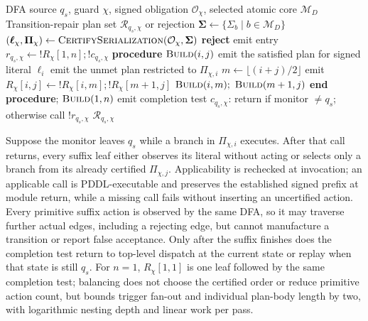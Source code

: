 \begin{algorithm}[htbp]
\caption{Compile a Certified DFA Progress Controller}
\label{alg:temporal}
\begin{algorithmic}[1]
\REQUIRE DFA source $q_s$, guard $\chi$, signed obligation $\mathcal O_\chi$,
selected atomic core $\mathcal M_D$
\ENSURE Transition-repair plan set $\mathcal R_{q_s,\chi}$ or rejection
\STATE $\boldsymbol\Sigma\leftarrow
\{\Sigma_b\mid b\in\mathcal M_D\}$
\STATE $(\boldsymbol\ell_\chi,\boldsymbol\Pi_\chi)\leftarrow
\textsc{CertifySerialization}(\mathcal O_\chi,\boldsymbol\Sigma)$
\IF{$(\boldsymbol\ell_\chi,\boldsymbol\Pi_\chi)=\bot$}
  \STATE \textbf{reject}
\ENDIF
\STATE emit entry $r_{q_s,\chi}\leftarrow !R_\chi[1,n];!c_{q_s,\chi}$
\STATE \textbf{procedure} $\textsc{Build}(i,j)$
  \STATE emit the satisfied plan for signed literal $\ell_i$
    \STATE emit the unmet plan restricted to $\Pi_{\chi,i}$
  \ENDIF
\ELSE
  \STATE $m\leftarrow\lfloor(i+j)/2\rfloor$
  \STATE emit $R_\chi[i,j]\leftarrow !R_\chi[i,m];!R_\chi[m+1,j]$
  \STATE $\textsc{Build}(i,m);\ \textsc{Build}(m+1,j)$
\ENDIF
\STATE \textbf{end procedure}; $\textsc{Build}(1,n)$
\STATE emit completion test $c_{q_s,\chi}$: return if monitor $\ne q_s$;
otherwise call $!r_{q_s,\chi}$
\RETURN $\mathcal R_{q_s,\chi}$
\end{algorithmic}
\end{algorithm}

Suppose the monitor leaves $q_s$ while a branch in $\Pi_{\chi,i}$ executes. After
that call returns, every suffix leaf either observes its literal without acting
or selects only a branch from its already certified $\Pi_{\chi,j}$. Applicability
is rechecked at invocation; an applicable call is PDDL-executable and preserves
the established signed prefix at module return, while a missing call fails
without inserting an uncertified action. Every primitive suffix action is
observed by the same DFA, so it may traverse further actual edges, including a
rejecting edge, but cannot manufacture a transition or report false acceptance.
Only after the suffix finishes does the completion test return to top-level
dispatch at the current state or replay when that state is still $q_s$. For
$n=1$, $R_\chi[1,1]$ is one leaf followed by the same completion test; balancing
does not choose the certified order or reduce primitive action count, but bounds
trigger fan-out and individual plan-body length by two, with logarithmic nesting
depth and linear work per pass.


